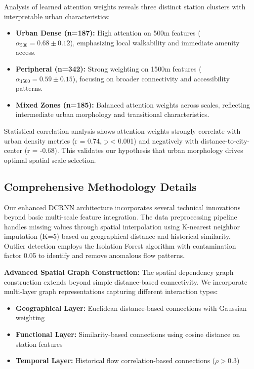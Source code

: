 \documentclass[sigconf,review,nonacm]{acmart}
\begin{document}
Analysis of learned attention weights reveals three distinct station clusters with interpretable urban characteristics:

\begin{itemize}
\item \textbf{Urban Dense (n=187):} High attention on 500m features ($\alpha_{500} = 0.68 \pm 0.12$), emphasizing local walkability and immediate amenity access.

\item \textbf{Peripheral (n=342):} Strong weighting on 1500m features ($\alpha_{1500} = 0.59 \pm 0.15$), focusing on broader connectivity and accessibility patterns.

\item \textbf{Mixed Zones (n=185):} Balanced attention weights across scales, reflecting intermediate urban morphology and transitional characteristics.
\end{itemize}

Statistical correlation analysis shows attention weights strongly correlate with urban density metrics (r = 0.74, p < 0.001) and negatively with distance-to-city-center (r = -0.68). This validates our hypothesis that urban morphology drives optimal spatial scale selection.

\subsection{Comprehensive Methodology Details}

Our enhanced DCRNN architecture incorporates several technical innovations beyond basic multi-scale feature integration. The data preprocessing pipeline handles missing values through spatial interpolation using K-nearest neighbor imputation (K=5) based on geographical distance and historical similarity. Outlier detection employs the Isolation Forest algorithm with contamination factor 0.05 to identify and remove anomalous flow patterns.

\textbf{Advanced Spatial Graph Construction:}
The spatial dependency graph construction extends beyond simple distance-based connectivity. We incorporate multi-layer graph representations capturing different interaction types:
\begin{itemize}
\item \textbf{Geographical Layer:} Euclidean distance-based connections with Gaussian weighting
\item \textbf{Functional Layer:} Similarity-based connections using cosine distance on station features
\item \textbf{Temporal Layer:} Historical flow correlation-based connections ($\rho > 0.3$)
\end{itemize}
\end{document}
